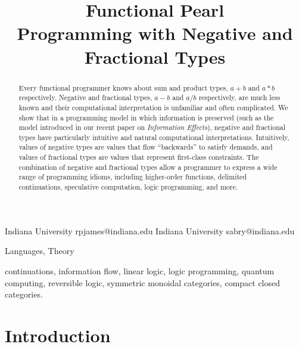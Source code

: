 \documentclass[preprint]{sigplanconf}
\begin{document}
\CopyrightYear{}
\copyrightdata{}
\titlebanner{}
\preprintfooter{}

\title{Functional Pearl \\ Programming with Negative and Fractional Types} 
           {Indiana University}
           {rpjames@indiana.edu}
           {Indiana University}
           {sabry@indiana.edu}
\maketitle

\begin{abstract}
  Every functional programmer knows about sum and product types, $a+b$ and
  $a*b$ respectively. Negative and fractional types, $a-b$ and $a/b$
  respectively, are much less known and their computational interpretation is
  unfamiliar and often complicated. We show that in a programming model in
  which information is preserved (such as the model introduced in our recent
  paper on \emph{Information Effects}), negative and fractional types have
  particularly intuitive and natural computational
  interpretations. Intuitively, values of negative types are values that flow
  ``backwards'' to satisfy demands, and values of fractional types are values
  that represent first-class constraints. The combination of negative and
  fractional types allow a programmer to express a wide range of programming
  idioms, including higher-order functions, delimited continuations,
  speculative computation, logic programming, and more.
\end{abstract}


\terms
Languages, Theory

\keywords continuations, information flow, linear logic, logic programming,
quantum computing, reversible logic, symmetric monoidal categories, compact
closed categories.

\section{Introduction}
\end{document}
